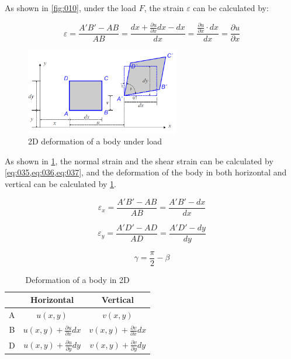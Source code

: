 \documentclass[en,hazy,cyan,8pt,normal]{elegantnote}
\numberwithin{equation}{section}
\begin{document}
    As shown in \cref{fig:010}, under the load $F$, the strain $\varepsilon$ can be calculated by:

    \begin{equation}\label{eq:034}
      \varepsilon
      =\frac{A'B'-AB}{AB}
      =\frac{dx+\frac{\partial u}{\partial x}dx - dx}{dx}
      =\frac{\frac{\partial u}{\partial x}\cdot dx}{dx}=\frac{\partial u}{\partial x}
    \end{equation}
    
    \begin{figure}[H]
      \centering
      \includegraphics[width=0.6\textwidth]{image/011.png}
      \caption{2D deformation of a body under load}
      \label{fig:011}
    \end{figure}

    As shown in \cref{fig:011}, the normal strain and the shear strain can be calculated by \cref{eq:035,eq:036,eq:037}, and the deformation of the body in both horizontal and vertical can be calculated by \cref{tab:001}.

    \begin{equation}\label{eq:035}
      \varepsilon_x=\frac{A'B'-AB}{AB}=\frac{A'B'-dx}{dx}
    \end{equation}

    \begin{equation}\label{eq:036}
      \varepsilon_y=\frac{A'D'-AD}{AD}=\frac{A'D'-dy}{dy}
    \end{equation}

    \begin{equation}\label{eq:037}
      \gamma=\frac{\pi}{2}-\beta
    \end{equation}

    \begin{table}[H]
      \centering
      \caption{Deformation of a body in 2D}
      \label{tab:001}
      \begin{tabular}{|c|c|c|}
        \hline
          & Horizontal & Vertical \\
        \hline
        A & $u(x,y)$ & $v(x,y)$ \\
        \hline
        B & $u(x,y)+\frac{\partial u}{\partial x}dx$ & $v(x,y)+\frac{\partial v}{\partial x}dx$ \\
        \hline
        D & $u(x,y)+\frac{\partial u}{\partial y}dy$ & $v(x,y)+\frac{\partial v}{\partial y}dy$ \\
        \hline
      \end{tabular}
    \end{table}
    
\end{document}
